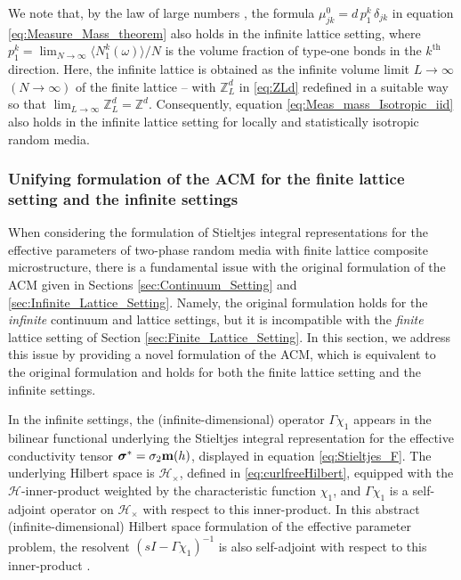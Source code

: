 \documentclass{cmslatex}
\newcommand\bsig{\mbox{\boldmath${\sigma}$}}
\begin{document}
We note that, by the law of large numbers
\cite{Durrett:Book:Probability}, the formula
$\mu_{jk}^0=d\,p_1^k\,\delta_{jk}$ in equation
\eqref{eq:Measure_Mass_theorem} also holds in the infinite lattice
setting, where $p_1^k=\lim_{N\to\infty}\langle N_1^k(\omega)\rangle/N$ is the volume fraction 
of type-one bonds in the $k^{\text{th}}$ direction. Here, the infinite
lattice is obtained as the infinite volume limit $L\to\infty$ $(N\to\infty)$ of the
finite lattice -- with $\mathbb{Z}_L^d$ in \eqref{eq:ZLd} redefined in a
suitable way so that $\lim_{L\to\infty}\mathbb{Z}_L^d=\mathbb{Z}^d$. Consequently, equation
\eqref{eq:Meas_mass_Isotropic_iid} also holds in the infinite lattice
setting for locally and statistically isotropic random media.





\subsubsection{Unifying formulation of the ACM for the finite lattice
  setting and the infinite settings}\label{sec:Unification_finite_infinite}
%
When considering the formulation of Stieltjes integral representations
for the effective parameters of two-phase random media with finite
lattice composite microstructure, there is a fundamental issue with
the original formulation of the ACM given in Sections
\ref{sec:Continuum_Setting} and
\ref{sec:Infinite_Lattice_Setting}. Namely, the original formulation
\cite{Golden:CMP-473,Bruno:PRSLA-353} holds for the \emph{infinite} 
continuum and lattice settings, but it is incompatible with the
\emph{finite} lattice setting of Section
\ref{sec:Finite_Lattice_Setting}. In this section, we address this
issue by providing a novel formulation of the ACM, which is equivalent to
the original formulation and holds for both the finite lattice setting
and the infinite settings.    




In the infinite settings, the (infinite-dimensional) operator $\Gamma\chi_1$
appears in the bilinear functional underlying the Stieltjes integral
representation for the effective conductivity tensor
$\bsig^*=\sigma_2\mathbf{m}(h)$, displayed in equation
\eqref{eq:Stieltjes_F}. The underlying Hilbert space is
$\mathscr{H}_\times$, defined in \eqref{eq:curlfreeHilbert}, equipped with
the $\mathscr{H}$-inner-product weighted by the characteristic function $\chi_1$, and $\Gamma\chi_1$
is a self-adjoint operator on $\mathscr{H}_\times$ with respect to this
inner-product. In this abstract (infinite-dimensional) Hilbert space
formulation of the effective parameter problem, the resolvent
$(sI-\Gamma\chi_1)^{-1}$ is also self-adjoint with respect to this
inner-product \cite{Stone:64}. 
\end{document}
